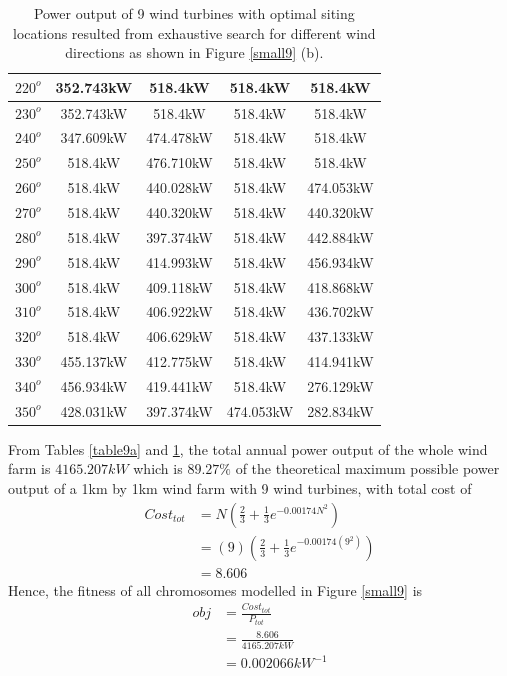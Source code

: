 \begin{table}[H]
\begin{tabular}{|c|c|c|c|c|}
        		$220^o$	& 352.743kW	& 518.4kW	& 518.4kW	& 518.4kW	\\ \hline
        		$230^o$	& 352.743kW	& 518.4kW	& 518.4kW	& 518.4kW	\\ \hline
        		$240^o$	& 347.609kW	& 474.478kW	& 518.4kW	& 518.4kW	\\ \hline
        		$250^o$	& 518.4kW	& 476.710kW	& 518.4kW	& 518.4kW	\\ \hline
        		$260^o$	& 518.4kW	& 440.028kW	& 518.4kW	& 474.053kW	\\ \hline
        		$270^o$	& 518.4kW	& 440.320kW	& 518.4kW	& 440.320kW	\\ \hline
        		$280^o$	& 518.4kW	& 397.374kW	& 518.4kW	& 442.884kW	\\ \hline
        		$290^o$	& 518.4kW	& 414.993kW	& 518.4kW	& 456.934kW	\\ \hline
        		$300^o$	& 518.4kW	& 409.118kW	& 518.4kW	& 418.868kW	\\ \hline
        		$310^o$	& 518.4kW	& 406.922kW	& 518.4kW	& 436.702kW	\\ \hline
        		$320^o$	& 518.4kW	& 406.629kW	& 518.4kW	& 437.133kW	\\ \hline
        		$330^o$	& 455.137kW	& 412.775kW	& 518.4kW	& 414.941kW	\\ \hline
        		$340^o$	& 456.934kW	& 419.441kW	& 518.4kW	& 276.129kW	\\ \hline
        		$350^o$	& 428.031kW	& 397.374kW	& 474.053kW	& 282.834kW	\\ \hline
        	\end{tabular}
        	\caption{Power output of 9 wind turbines with optimal siting locations resulted from exhaustive search for different wind directions as shown in Figure \ref{small9} (b).}
        	\label{table9b}
        \end{table}
        \doublespacing
        
        From Tables \ref{table9a} and \ref{table9b}, the total annual power output of the whole wind farm is $4165.207kW$ which is $89.27\%$ of the theoretical maximum possible power output of a 1km by 1km wind farm with 9 wind turbines, with total cost of
        \begin{align*}
            Cost_{tot}
            &= N\left(\frac{2}{3} + \frac{1}{3}e^{-0.00174N^2}\right) \\
            &= \left(9\right)\left(\frac{2}{3} + \frac{1}{3}e^{-0.00174\left(9^2\right)}\right) \\
            &= 8.606
        \end{align*}
        Hence, the fitness of all chromosomes modelled in Figure \ref{small9} is
        \begin{align*}
            obj
            &=\frac{Cost_{tot}}{P_{tot}} \\
            &=\frac{8.606}{4165.207kW} \\
            &=0.002066kW^{-1}
        \end{align*} 
    
